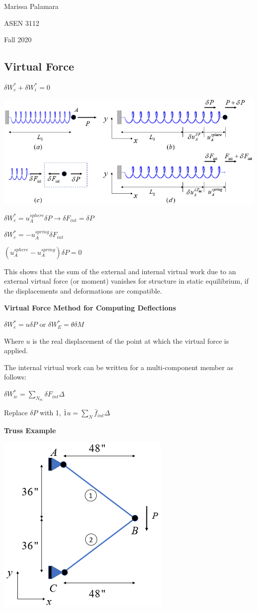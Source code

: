 \documentclass{article}
\begin{document}
\begin{multicols*}{2}
    Marissa Palamara\par 
    ASEN 3112\par 
    Fall 2020
    \vspace{-0.5cm}
    \subsection*{Virtual Force}
    $\delta W_e^*+\delta W_i^*=0$\par 
    \includegraphics[width=0.666\linewidth]{Figures/Virtual_Force_Springs.png}\par
    $\delta W_e^* = u_A^{sphere} \delta P \rightarrow \delta F_{int}=\delta P$\par 
    $\delta W_e^* = -u_A^{spring} \delta F_{int}$\par 
    $\left(u_A^{sphere}-u_A^{spring}\right)\delta P=0$\par 
    This shows that the sum of the external and internal virtual work due to an 
    external virtual force (or moment) vanishes for structure in static 
    equilibrium, if the displacements and deformations are compatible.

    \textbf{Virtual Force Method for Computing Deflections}\par 
    $\delta W_e^*=u \delta P$ or $\delta W_E^* = \theta \delta M$ \par 
    Where $u$ is the real displacement of the point at which the virtual force
    is applied. \par 
    The internal virtual work can be written for a multi-component member as follows:\par 
    $\delta W_{ie}^*=\sum\limits_{N_m} \delta F_{int} \Delta$\par 
    Replace $\delta P$ with 1, $\bar{1}u=\sum\limits_N \bar{f}_{int}\Delta$

    \textbf{Truss Example}
    
    \includegraphics[width=0.5\linewidth]{Figures/Truss_Example_VF.png}


\end{multicols*}
\end{document}
